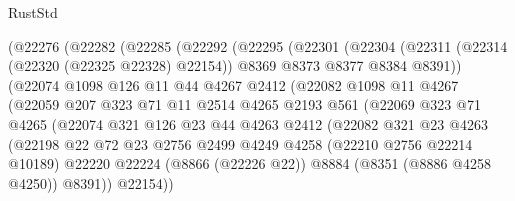 \begin{lexlean}{RustStd}
\begin{coremodule}
              (@22276
                (@22282
                  (@22285
                    (@22292
                      (@22295
                        (@22301
                          (@22304
                            (@22311
                              (@22314 (@22320 (@22325 @22328) @22154))
                              @8369
                              @8373
                              @8377
                              @8384
                              @8391))
                          (@22074
                            @1098
                            @126
                            @11
                            @44
                            @4267
                            @2412
                            (@22082
                              @1098
                              @11
                              @4267
                              (@22059
                                @207
                                @323
                                @71
                                @11
                                @2514
                                @4265
                                @2193
                                @561
                                (@22069
                                  @323
                                  @71
                                  @4265
                                  (@22074
                                    @321
                                    @126
                                    @23
                                    @44
                                    @4263
                                    @2412
                                    (@22082
                                      @321
                                      @23
                                      @4263
                                      (@22198
                                        @22
                                        @72
                                        @23
                                        @2756
                                        @2499
                                        @4249
                                        @4258
                                        (@22210 @2756 @22214 @10189)
                                        @22220
                                        @22224
                                        (@8866 (@22226 @22))
                                        @8884
                                        (@8351 (@8886 @4258 @4250))
                                        @8391))
                                    @22154))

\end{coremodule}
\end{lexlean}
